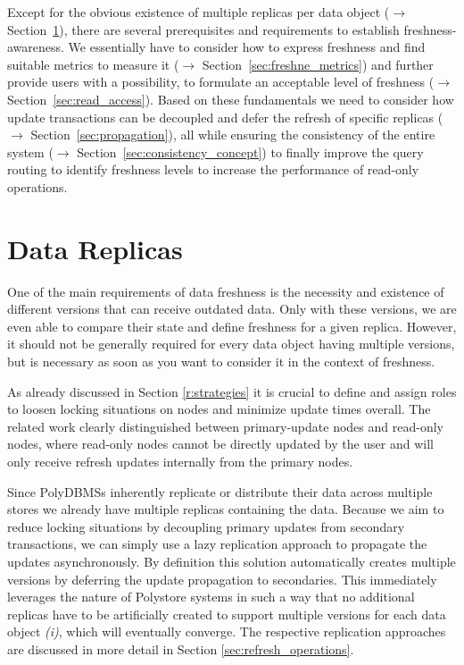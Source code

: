 Except for the obvious existence of multiple replicas per data object ($\rightarrow$ Section~\ref{sec:data_replicas}), 
there are several prerequisites and requirements to establish freshness-awareness. 
We essentially have to consider how to express freshness and find suitable metrics to measure it ($\rightarrow$ Section~\ref{sec:freshne_metrics})
and further provide users with a possibility, to formulate an acceptable level of freshness ($\rightarrow$ Section~\ref{sec:read_access}). 
Based on these fundamentals we need to consider how update transactions can be decoupled and defer the refresh of specific replicas 
($\rightarrow$ Section~\ref{sec:propagation}), all while ensuring the consistency of the entire system ($\rightarrow$ Section~\ref{sec:consistency_concept}) to finally 
improve the query routing to identify freshness levels to increase the performance of read-only operations. 



\section{Data Replicas}
\label{sec:data_replicas}

One of the main requirements of data freshness is the necessity and existence of different versions that can receive outdated data. 
Only with these versions, we are even able to compare their state and define freshness for a given replica.
However, it should not be generally required for every data object having multiple versions, but is necessary as soon 
as you want to consider it in the context of freshness.

As already discussed in Section \ref{r:strategies} it is crucial to define and assign roles to loosen locking situations on nodes
and minimize update times overall.
The related work clearly distinguished between primary-update nodes and read-only nodes, where 
read-only nodes cannot be directly updated by the user and will only receive refresh updates internally from the primary nodes.

Since PolyDBMSs inherently replicate or distribute their data across multiple stores we already have multiple replicas containing the data. 
Because we aim to reduce locking situations by decoupling primary updates from secondary transactions,
we can simply use a lazy replication approach to propagate the updates asynchronously. 
By definition this solution automatically creates multiple versions by deferring the update propagation to secondaries.
This immediately leverages the nature of Polystore systems in such a way that no additional replicas have to be artificially created
to support multiple versions for each data object \textit{(i)}, which will eventually converge. 
The respective replication approaches are discussed in more detail in Section \ref{sec:refresh_operations}.

